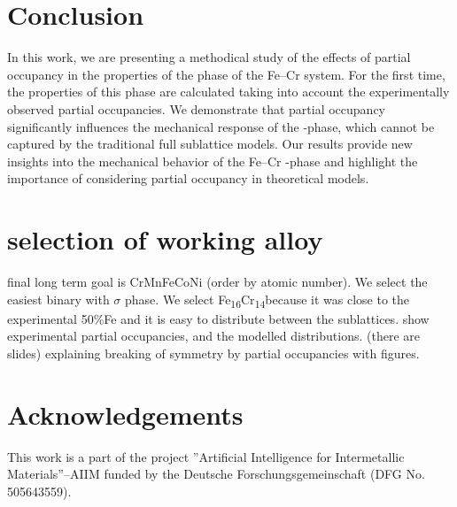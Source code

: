 \documentclass[superscriptaddress, 12pt]{revtex4-2}%
\newcommand{\fecrnominal}{Fe\textsubscript{16}Cr\textsubscript{14}}
\begin{document}
\section{Conclusion}

In this work, we are presenting a methodical study of the effects of partial occupancy in the properties of the \textsigma phase of the Fe--Cr system.
For the first time, the properties of this phase are calculated taking into account the experimentally observed partial occupancies.
We demonstrate that partial occupancy significantly influences the mechanical response of the \textsigma-phase, which cannot be captured by the traditional full sublattice models.
Our results provide new insights into the mechanical behavior of the Fe--Cr \textsigma-phase and highlight the importance of considering partial occupancy in theoretical models.

\section{selection of working alloy}
final long term goal is CrMnFeCoNi (order by atomic number).
We select the easiest binary with $\sigma$ phase.
We select \fecrnominal because it was close to the experimental 50\%Fe and it is easy to distribute between the sublattices.
show experimental partial occupancies, and the modelled distributions.
(there are slides)
explaining breaking of symmetry by partial occupancies with figures.

\section*{Acknowledgements} 

This work is a part of the project ”Artificial Intelligence for Intermetallic Materials”–AIIM funded by the Deutsche Forschungsgemeinschaft (DFG No. 505643559). 
 
\end{document}
